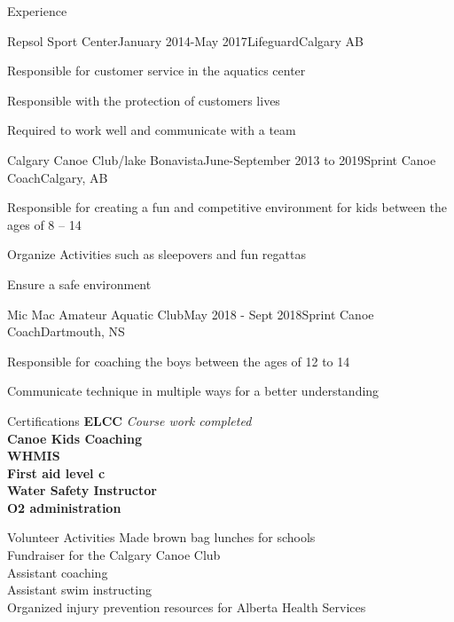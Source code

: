\documentclass{resume}
\begin{document}
\begin{rSection}{Experience}

	\begin{rSubsection}{Repsol Sport Center}{January 2014-May 2017}{Lifeguard}{Calgary AB}
	\item Responsible for customer service in the aquatics center 
	\item Responsible with the protection of customers lives
	\item Required to work well and communicate with a team
	\end{rSubsection}

	\begin{rSubsection}{Calgary Canoe Club/lake Bonavista}{June-September 2013 to 2019}{Sprint Canoe Coach}{Calgary, AB}
	\item Responsible for creating a fun and competitive environment for kids between the ages of 8 -- 14
	\item Organize Activities such as sleepovers and fun regattas 
	\item Ensure a safe environment
	\end{rSubsection}

	\begin{rSubsection}{Mic Mac Amateur Aquatic Club}{May 2018 - Sept 2018}{Sprint Canoe Coach}{Dartmouth, NS}
	\item Responsible for coaching the boys between the ages of 12 to 14
	\item Communicate technique in multiple ways for a better understanding
	\end{rSubsection}

\end{rSection}


\begin{rSection}{Certifications}
	{\bf ELCC }{\em Course work completed}\\
	{\bf Canoe Kids Coaching    }\\
	{\bf WHMIS                  }\\
	{\bf First aid level c      }\\
	{\bf Water Safety Instructor}\\
	{\bf O2 administration      }
\end{rSection}

\begin{rSection}{Volunteer Activities}
	{Made brown bag lunches for schools}\\
	{Fundraiser for the Calgary Canoe Club}\\
	{Assistant coaching}\\
	{Assistant swim instructing}\\
	{Organized injury prevention resources for Alberta Health Services}
\end{rSection}
\end{document}
